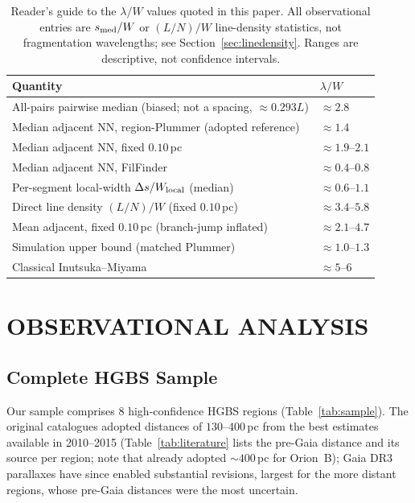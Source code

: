 \documentclass[usenatbib,twoside,twocolumn]{mnras}
\begin{document}
\begin{table}
\caption{Reader's guide to the $\lambda/W$ values quoted in this paper. All observational entries are $s_{\rm med}/W$ or $(L/N)/W$ line-density statistics, not fragmentation wavelengths; see Section~\ref{sec:linedensity}. Ranges are descriptive, not confidence intervals.}
\label{tab:master}
\footnotesize
\setlength{\tabcolsep}{4pt}
\begin{tabular}{@{}p{5.4cm}l@{}}
\toprule
Quantity & $\lambda/W$ \\
\midrule
All-pairs pairwise median (biased; not a spacing, $\approx0.293L$) & $\approx2.8$ \\
Median adjacent NN, region-Plummer (adopted reference) & $\approx1.4$ \\
Median adjacent NN, fixed $0.10$\,pc & $\approx1.9$--$2.1$ \\
Median adjacent NN, FilFinder & $\approx0.4$--$0.8$ \\
Per-segment local-width $\Delta s/W_{\rm local}$ (median) & $\approx0.6$--$1.1$ \\
Direct line density $(L/N)/W$ (fixed $0.10$\,pc) & $\approx3.4$--$5.8$ \\
Mean adjacent, fixed $0.10$\,pc (branch-jump inflated) & $\approx2.1$--$4.7$ \\
Simulation upper bound (matched Plummer) & $\approx1.0$--$1.3$ \\
Classical Inutsuka--Miyama & $\approx5$--$6$ \\
\bottomrule
\end{tabular}
\end{table}

\section{OBSERVATIONAL ANALYSIS}

\subsection{Complete HGBS Sample}

Our sample comprises 8 high-confidence HGBS regions (Table~\ref{tab:sample}). The original catalogues \citep{Konyves2015, Konyves2020, Ladjelate2020, Pezzuto2021} adopted distances of $130$--$400$\,pc from the best estimates available in 2010--2015 (Table~\ref{tab:literature} lists the pre-Gaia distance and its source per region; note that \citealt{Konyves2020} already adopted $\sim400$\,pc for Orion~B); Gaia DR3 parallaxes \citep{Zhang2023} have since enabled substantial revisions, largest for the more distant regions, whose pre-Gaia distances were the most uncertain.
\end{document}
